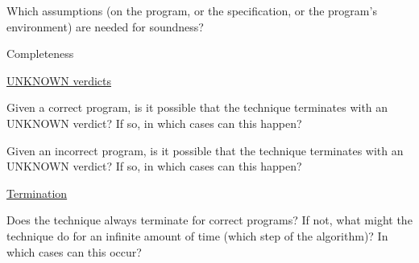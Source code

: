 \documentclass[a4paper]{article}
\begin{document}
\begin{minipage}[t]{0.16\linewidth}
\begin{betterlist}
\begin{betterlist}
\begin{betterlist}
			\end{betterlist}
			\item Which assumptions (on the program, or the specification, or the program’s environment) are needed for soundness?
		\end{betterlist}
		\item \alert{Completeness}
		\begin{betterlist}
			\item \underline{UNKNOWN verdicts}
			\begin{betterlist}
				\item Given a correct program, is it possible that the technique terminates with an UNKNOWN verdict? If so, in which cases can this happen?

				\item Given an incorrect program, is it possible that the technique terminates with an UNKNOWN verdict? If so, in which cases can this happen?

			\end{betterlist}
			\item \underline{Termination}
			\begin{betterlist}
				\item Does the technique always terminate for correct programs? If not, what might the technique do for an infinite amount of time (which step of the algorithm)? In which cases can this occur?


\end{betterlist}
\end{betterlist}
\end{betterlist}
\end{minipage}
\end{document}
